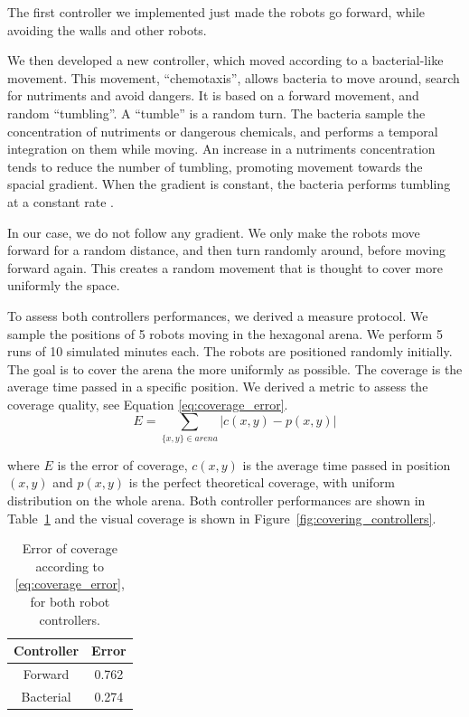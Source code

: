 \documentclass[letterpaper, oneside]{article}
\begin{document}
The first controller we implemented just made the robots go forward, while avoiding the walls and other robots.

We then developed a new controller, which moved according to a bacterial-like movement. This movement, ``chemotaxis'', allows bacteria to move around, search for nutriments and avoid dangers. It is based on a forward movement, and random ``tumbling''. A ``tumble'' is a random turn. The bacteria sample the concentration of nutriments or dangerous chemicals, and performs a temporal integration on them while moving. An increase in a nutriments concentration tends to reduce the number of tumbling, promoting movement towards the spacial gradient. When the gradient is constant, the bacteria performs tumbling at a constant rate \cite{Adler:1975p7745}\cite{Macnab:1972p7813}.

In our case, we do not follow any gradient. We only make the robots move forward for a random distance, and then turn randomly around, before moving forward again. This creates a random movement that is thought to cover more uniformly the space.

To assess both controllers performances, we derived a measure protocol.
We sample the positions of 5 robots moving in the hexagonal arena. We perform 5 runs of 10 simulated minutes each. The robots are positioned randomly initially. The goal is to cover the arena the more uniformly as possible. The coverage is the average time passed in a specific position. We derived a metric to assess the coverage quality, see Equation \eqref{eq:coverage_error}.
\begin{equation} \label{eq:coverage_error}
	E = \sum_{\{x,y\} \in arena}|c(x,y) - p(x,y)|
\end{equation}

where $E$ is the error of coverage, $c(x,y)$ is the average time passed in position $(x,y)$ and $p(x,y)$ is the perfect theoretical coverage, with uniform distribution on the whole arena.
Both controller performances are shown in Table~\ref{tab:error_coverage} and the visual coverage is shown in Figure~\ref{fig:covering_controllers}. 

\begin{table}[h!]
	\begin{center}
	\begin{tabular}{|c|c|}
		\hline
		\textbf{Controller} & \textbf{Error} \\
		\hline
		Forward & 0.762 \\
		\hline
		Bacterial & 0.274 \\
		\hline
	\end{tabular}
	\end{center}
	\caption{Error of coverage according to \eqref{eq:coverage_error}, for both robot controllers.}
	\label{tab:error_coverage}
\end{table}
\end{document}
